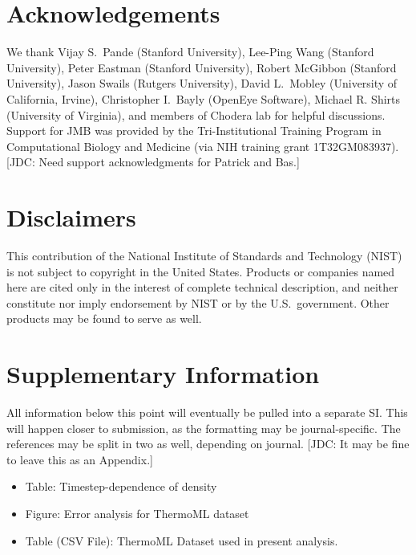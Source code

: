 \documentclass[aps,pre,twocolumn,nofootinbib,superscriptaddress,linenumbers]{revtex4-1}
\begin{document}
\section{Acknowledgements}

We thank Vijay S.~Pande (Stanford University), Lee-Ping Wang (Stanford University), Peter Eastman (Stanford University), Robert McGibbon (Stanford University), Jason Swails (Rutgers University), David L.~Mobley (University of California, Irvine), Christopher I.~Bayly (OpenEye Software), Michael R. Shirts (University of Virginia), and members of Chodera lab for helpful discussions.  
Support for JMB was provided by the Tri-Institutional Training Program in Computational Biology and Medicine (via NIH training grant 1T32GM083937).
{\color{red}[JDC: Need support acknowledgments for Patrick and Bas.]}


\section{Disclaimers}

This contribution of the National Institute of Standards and Technology (NIST) is not subject to copyright in the United States.  
Products or companies named here are cited only in the interest of complete technical description, and neither constitute nor imply endorsement by NIST or by the U.S.~government.  
Other products may be found to serve as well.

\clearpage

\appendix 

\section{Supplementary Information}

All information below this point will eventually be pulled into a separate SI.  
This will happen closer to submission, as the formatting may be journal-specific.  
The references may be split in two as well, depending on journal.
{\color{red}[JDC: It may be fine to leave this as an Appendix.]}

\begin{itemize}
 \item Table: Timestep-dependence of density
 \item Figure: Error analysis for ThermoML dataset
 \item Table (CSV File): ThermoML Dataset used in present analysis.
\end{itemize}
\end{document}
